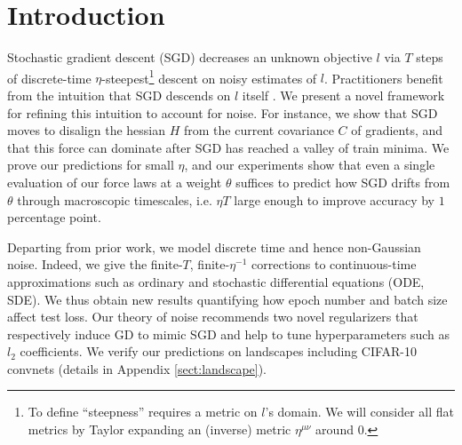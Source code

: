 \documentclass{article}
\theoremstyle{plain}
\theoremstyle{definition}
\begin{document}

\section{Introduction}



    Stochastic gradient descent (SGD) decreases an unknown objective $l$ via
    $T$ steps of discrete-time $\eta$-steepest\footnote{
        To define ``steepness'' requires a metric on $l$'s domain.  We will
        consider all flat metrics by Taylor expanding an (inverse)
        metric $\eta^{\mu\nu}$ around $0$.
    } descent on noisy estimates of $l$.
    Practitioners benefit from the intuition that SGD descends on $l$ itself
    \cite{bo91}.  We present a novel framework for refining this intuition to
    account for noise.  For instance, we show that SGD moves to disalign the
    hessian $H$ from the current covariance $C$ of gradients, and that this
    force can dominate after SGD has reached a valley of train minima.  We
    prove our predictions for small $\eta$, and our experiments show that even
    a single evaluation of our force laws at a weight $\theta$ suffices to
    predict how SGD drifts from $\theta$ through macroscopic timescales, i.e.
    $\eta T$ large enough to improve accuracy by $1$ percentage point.   
    


    Departing from prior work, we model discrete time and hence non-Gaussian
    noise.  Indeed, we give the finite-$T$, finite-$\eta^{-1}$ corrections to
    continuous-time approximations such as ordinary and stochastic differential
    equations (ODE, SDE).  
    We thus obtain new results quantifying how epoch number and batch size
    affect test loss.
    Our theory of noise recommends two novel regularizers that respectively
    induce GD to mimic SGD and help to tune hyperparameters such as $l_2$
    coefficients.
    We verify our predictions on landscapes including CIFAR-10 convnets
    (details in Appendix \ref{sect:landscape}).
\end{document}
